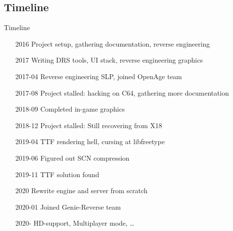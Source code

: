 \documentclass{beamer}
\begin{document}

\subsection{Timeline}

\begin{frame}{Timeline}
	\begin{itemize}
		\item[2016] Project setup, gathering documentation, reverse engineering
		\item[2017] Writing DRS tools, UI stack, reverse engineering graphics
		\item[2017-04] Reverse engineering SLP, joined OpenAge team
		\item[2017-08] Project stalled: hacking on C64, gathering more documentation
		\item[2018-09] Completed in-game graphics
		\item[2018-12] Project stalled: Still recovering from X18
		\item[2019-04] TTF rendering hell, cursing at libfreetype
		\item[2019-06] Figured out SCN compression
		\item[2019-11] TTF solution found
		\item[2020] Rewrite engine and server from scratch
		\item[2020-01] Joined Genie-Reverse team
		\item[2020-] HD-support, Multiplayer mode, \dots
	\end{itemize}
\end{frame}

\end{document}
